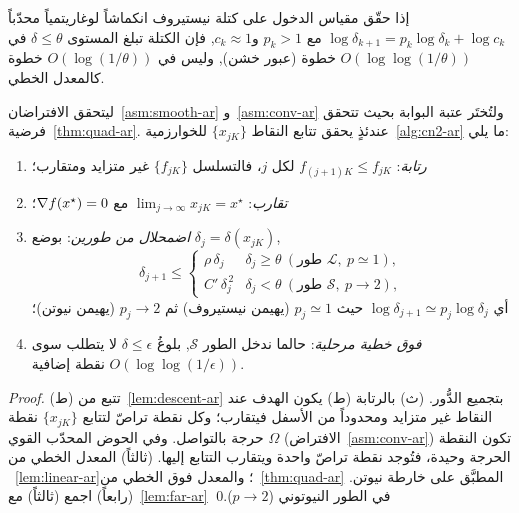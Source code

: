 \begin{lemma}
\label{lem:far-ar}
إذا حقّق مقياس الدخول على كتلة نيستيروف انكماشاً لوغاريتمياً محدّباً
$\log\delta_{k+1}=p_k\log\delta_k+\log c_k$ مع $p_k>1$ و$c_k\approx1$, فإن الكتلة
تبلغ المستوى $\delta\le\theta$ في $O(\log\log(1/\theta))$ خطوة (عبور خشن), وليس في
$O(\log(1/\theta))$ خطوة كالمعدل الخطي.
\end{lemma}

\begin{theorem}
\label{thm:checkpoint-ar}
ليتحقق الافتراضان~\ref{asm:smooth-ar} و~\ref{asm:conv-ar} ولتُختَر عتبة البوابة بحيث
تتحقق فرضية~\ref{thm:quad-ar}. عندئذٍ يحقق تتابع النقاط $\{x_{jK}\}$ للخوارزمية~\ref{alg:cn2-ar} ما يلي:
\begin{enumerate}[label=(\roman*)]
  \item \emph{رتابة}: $f_{(j+1)K}\le f_{jK}$ لكل $j$، فالتسلسل $\{f_{jK}\}$ غير متزايد ومتقارب؛
  \item \emph{تقارب}: $\lim_{j\to\infty}x_{jK}=x^\star$ مع $\nabla f(x^\star)=0$؛
  \item \emph{اضمحلال من طورين}: بوضع $\delta_j=\delta(x_{jK})$,
        $$\delta_{j+1}\le
        \begin{cases}
          \rho\,\delta_j & \delta_j\ge\theta\ (\text{طور }\mathcal{L},\ p\simeq1),\\[2pt]
          C'\,\delta_j^{\,2} & \delta_j<\theta\ (\text{طور }\mathcal{S},\ p\to2),
        \end{cases}$$
        أي $\log\delta_{j+1}\simeq p_j\log\delta_j$ حيث $p_j\simeq1$ (يهيمن نيستيروف)
        ثم $p_j\to2$ (يهيمن نيوتن)؛
  \item \emph{فوق خطية مرحلية}: حالما ندخل الطور $\mathcal{S}$, بلوغُ $\delta\le\epsilon$
        لا يتطلب سوى $O(\log\log(1/\epsilon))$ نقطة إضافية.
\end{enumerate}
\end{theorem}

\begin{proof}
(ط) تتبع من~\ref{lem:descent-ar} بتجميع الدُّور. (ث) بالرتابة (ط) يكون الهدف عند النقاط
غير متزايد ومحدوداً من الأسفل فيتقارب؛ وكل نقطة تراصّ لتتابع $\{x_{jK}\}$ نقطة حرجة
بالتواصل. وفي الحوض المحدّب القوي $\Omega$ (الافتراض~\ref{asm:conv-ar}) تكون النقطة
الحرجة وحيدة، فتُوجد نقطة تراصّ واحدة ويتقارب التتابع إليها. (ثالثاً) المعدل الخطي من
~\ref{lem:linear-ar}؛ والمعدل فوق الخطي من~\ref{thm:quad-ar} المطبَّق على خارطة نيوتن.
(رابعاً) اجمع (ثالثاً) مع~\ref{lem:far-ar} في الطور النيوتوني ($p\to2$).\qed
\end{proof}

